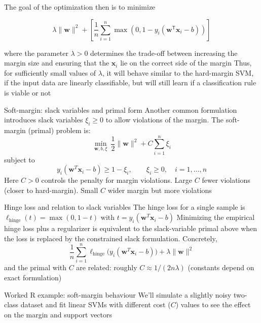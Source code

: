 \documentclass[aspectratio=169]{beamer}\usepackage[]{graphicx}\usepackage[]{xcolor}
\begin{document}
\begin{frame}
    The goal of the optimization then is to minimize
    
    \[ 
        \lambda \lVert \mathbf{w} \rVert^2 +\left[\frac 1 n \sum_{i=1}^n \max\left(0, 1 - y_i(\mathbf{w}^\mathsf{T} \mathbf{x}_i - b)\right) \right]
    \]
    
    where the parameter $\lambda > 0$ determines the trade-off between increasing the margin size and ensuring that the $\mathbf{x}_i$ lie on the correct side of the margin
    \vfill
    Thus, for sufficiently small values of $\lambda$, it will behave similar to the hard-margin SVM, if the input data are linearly classifiable, but will still learn if a classification rule is viable or not
\end{frame}

\begin{frame}{Soft-margin: slack variables and primal form}
    Another common formulation introduces slack variables $\xi_i \ge 0$ to allow violations of the margin. The soft-margin (primal) problem is:
    \[
        \min_{\mathbf{w},b,\xi}\ \frac{1}{2}\lVert\mathbf{w}\rVert^2 + C\sum_{i=1}^n \xi_i
    \]
    subject to
    \[
        y_i(\mathbf{w}^T\mathbf{x}_i - b) \ge 1 - \xi_i,\qquad \xi_i \ge 0,\quad i=1,\dots,n
    \]
    Here $C>0$ controls the penalty for margin violations. Large $C$ \textemdash{} fewer violations (closer to hard-margin). Small $C$ \textemdash{} wider margin but more violations
\end{frame}

\begin{frame}{Hinge loss and relation to slack variables}
    The hinge loss for a single sample is $\ell_{\mathrm{hinge}}(t) = \max(0,1-t)$ with $t=y_i(\mathbf{w}^T\mathbf{x}_i-b)$
    \vfill
    Minimizing the empirical hinge loss plus a regularizer is equivalent to the slack-variable primal above when the loss is replaced by the constrained slack formulation. Concretely,
    \[
        \frac{1}{n}\sum_{i=1}^n \ell_{\mathrm{hinge}}\big(y_i(\mathbf{w}^T\mathbf{x}_i-b)\big) + \lambda\lVert\mathbf{w}\rVert^2
    \]
    and the primal with $C$ are related: roughly $C \approx 1/(2n\lambda)$ (constants depend on exact formulation)
\end{frame}

\begin{frame}{Worked R example: soft-margin behaviour}
    We'll simulate a slightly noisy two-class dataset and fit linear SVMs with different cost ($C$) values to see the effect on the margin and support vectors
\end{frame}
\end{document}
